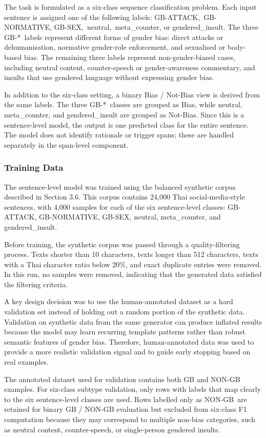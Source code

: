 \documentclass[12pt,oneside,openright,a4paper]{cpe-english-project}
\begin{document}
The task is formulated as a six-class sequence classification problem. Each input sentence is assigned one of the following labels: GB-ATTACK,~GB-NORMATIVE, GB-SEX,~neutral,~meta\_counter, or gendered\_insult. The three GB-*~labels represent different forms of gender bias: direct attacks or dehumanisation, normative gender-role enforcement, and sexualised or body-based bias. The remaining three labels represent non-gender-biased cases, including neutral content, counter-speech or gender-awareness commentary, and insults that use gendered language without expressing gender bias.

In addition to the six-class setting, a binary Bias / Not-Bias view is derived from the same labels. The three GB-*~classes are grouped as Bias, while neutral, meta\_counter, and gendered\_insult are grouped as Not-Bias. Since this is a sentence-level model, the output is one predicted class for the entire sentence. The model does not identify rationale or trigger spans; these are handled separately in the span-level component.

\subsubsection{Training Data}

The sentence-level model was trained using the balanced synthetic corpus described in Section 3.6. This corpus contains 24,000 Thai social-media-style sentences, with 4,000 samples for each of the six sentence-level classes: GB-ATTACK, GB-NORMATIVE, GB-SEX, neutral, meta\_counter, and gendered\_insult.

Before training, the synthetic corpus was passed through a quality-filtering process. Texts shorter than 10 characters, texts longer than 512 characters, texts with a Thai character ratio below 20\%, and exact duplicate entries were removed. In this run, no samples were removed, indicating that the generated data satisfied the filtering criteria.

A key design decision was to use the human-annotated dataset as a hard validation set instead of holding out a random portion of the synthetic data. Validation on synthetic data from the same generator can produce inflated results because the model may learn recurring template patterns rather than robust semantic features of gender bias. Therefore, human-annotated data was used to provide a more realistic validation signal and to guide early stopping based on real examples.

The annotated dataset used for validation contains both GB and NON-GB examples. For six-class subtype validation, only rows with labels that map clearly to the six sentence-level classes are used. Rows labelled only as NON-GB~are retained for binary GB / NON-GB evaluation but excluded from six-class F1 computation because they may correspond to multiple non-bias categories, such as neutral content, counter-speech, or single-person gendered insults.
\end{document}
